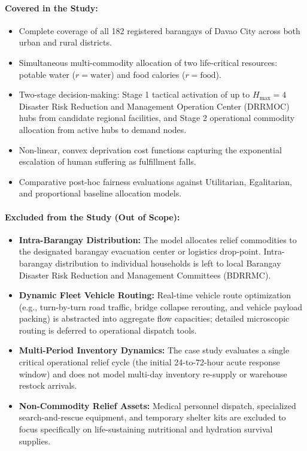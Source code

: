 \paragraph{Covered in the Study:}
\begin{itemize}
    \item Complete coverage of all 182 registered barangays of Davao City across both urban and rural districts.
    \item Simultaneous multi-commodity allocation of two life-critical resources: potable water ($r=\text{water}$) and food calories ($r=\text{food}$).
    \item Two-stage decision-making: Stage 1 tactical activation of up to $H_{\max}=4$ Disaster Risk Reduction and Management Operation Center (DRRMOC) hubs from candidate regional facilities, and Stage 2 operational commodity allocation from active hubs to demand nodes.
    \item Non-linear, convex deprivation cost functions capturing the exponential escalation of human suffering as fulfillment falls.
    \item Comparative post-hoc fairness evaluations against Utilitarian, Egalitarian, and proportional baseline allocation models.
\end{itemize}

\paragraph{Excluded from the Study (Out of Scope):}
\begin{itemize}
    \item \textbf{Intra-Barangay Distribution:} The model allocates relief commodities to the designated barangay evacuation center or logistics drop-point. Intra-barangay distribution to individual households is left to local Barangay Disaster Risk Reduction and Management Committees (BDRRMC).
    \item \textbf{Dynamic Fleet Vehicle Routing:} Real-time vehicle route optimization (e.g., turn-by-turn road traffic, bridge collapse rerouting, and vehicle payload packing) is abstracted into aggregate flow capacities; detailed microscopic routing is deferred to operational dispatch tools.
    \item \textbf{Multi-Period Inventory Dynamics:} The case study evaluates a single critical operational relief cycle (the initial 24-to-72-hour acute response window) and does not model multi-day inventory re-supply or warehouse restock arrivals.
    \item \textbf{Non-Commodity Relief Assets:} Medical personnel dispatch, specialized search-and-rescue equipment, and temporary shelter kits are excluded to focus specifically on life-sustaining nutritional and hydration survival supplies.
\end{itemize}

